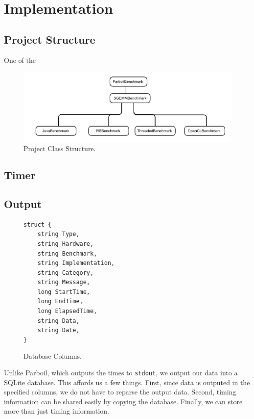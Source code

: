 
\section*{Implementation}

\subsection*{Project Structure}

One of the 


\begin{figure}[t!]
\includegraphics[scale=0.43]{class_arch.png}
\caption{Project Class Structure.}
\label{fig:projclass}
\centering
\end{figure}


\subsection*{Timer}



\subsection*{Output}


\begin{figure}[t!]
\begin{verbatim}
struct {
	string Type,
	string Hardware,
	string Benchmark,
	string Implementation,
	string Category,
	string Message,
	long StartTime,
	long EndTime,
	long ElapsedTime,
	string Data,
	string Date,
}
\end{verbatim}
\caption{Database Columns.}
\label{fig:database}
\centering
\end{figure}

Unlike Parboil, which outputs the times to {\tt stdout}, we output our data into a SQLite database.
This affords us a few things.
First, since data is outputed in the specified columns, we do not have to reparse the output data.
Second, timing information can be shared easily by copying the database.
Finally, we can store more than just timing information.

